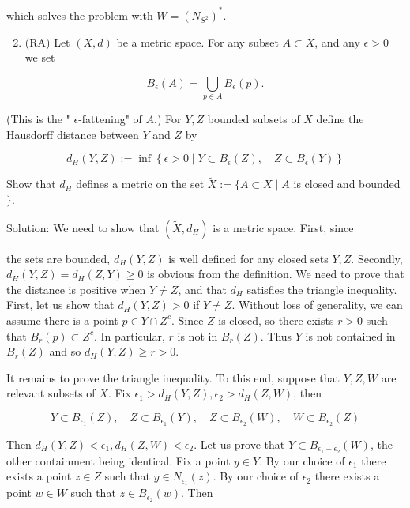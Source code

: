 \documentclass[10pt]{article}
\begin{document}
which solves the problem with $W=\left(N_{S^{2}}\right)^{*}$.

\begin{enumerate}
  \setcounter{enumi}{1}
  \item (RA) Let $(X, d)$ be a metric space. For any subset $A \subset X$, and any $\epsilon>0$ we set
\end{enumerate}

$$
B_{\epsilon}(A)=\bigcup_{p \in A} B_{\epsilon}(p) .
$$

(This is the " $\epsilon$-fattening" of $A$.) For $Y, Z$ bounded subsets of $X$ define the Hausdorff distance between $Y$ and $Z$ by

$$
d_{H}(Y, Z):=\inf \left\{\epsilon>0 \mid Y \subset B_{\epsilon}(Z), \quad Z \subset B_{\epsilon}(Y)\right\}
$$

Show that $d_{H}$ defines a metric on the set $\tilde{X}:=\{A \subset X \mid A$ is closed and bounded $\}$.

Solution: We need to show that $\left(\tilde{X}, d_{H}\right)$ is a metric space. First, since

the sets are bounded, $d_{H}(Y, Z)$ is well defined for any closed sets $Y, Z$. Secondly, $d_{H}(Y, Z)=d_{H}(Z, Y) \geq 0$ is obvious from the definition. We need to prove that the distance is positive when $Y \neq Z$, and that $d_{H}$ satisfies the triangle inequality. First, let us show that $d_{H}(Y, Z)>0$ if $Y \neq Z$. Without loss of generality, we can assume there is a point $p \in Y \cap Z^{c}$. Since $Z$ is closed, so there exists $r>0$ such that $B_{r}(p) \subset Z^{c}$. In particular, $r$ is not in $B_{r}(Z)$. Thus $Y$ is not contained in $B_{r}(Z)$ and so $d_{H}(Y, Z) \geq r>0$.

It remains to prove the triangle inequality. To this end, suppose that $Y, Z, W$ are relevant subsets of $X$. Fix $\epsilon_{1}>d_{H}(Y, Z), \epsilon_{2}>d_{H}(Z, W)$, then

$$
Y \subset B_{\epsilon_{1}}(Z), \quad Z \subset B_{\epsilon_{1}}(Y), \quad Z \subset B_{\epsilon_{2}}(W), \quad W \subset B_{\epsilon_{2}}(Z)
$$

Then $d_{H}(Y, Z)<\epsilon_{1}, d_{H}(Z, W)<\epsilon_{2}$. Let us prove that $Y \subset B_{\epsilon_{1}+\epsilon_{2}}(W)$, the other containment being identical. Fix a point $y \in Y$. By our choice of $\epsilon_{1}$ there exists a point $z \in Z$ such that $y \in N_{\epsilon_{1}}(z)$. By our choice of $\epsilon_{2}$ there exists a point $w \in W$ such that $z \in B_{\epsilon_{2}}(w)$. Then
\end{document}
